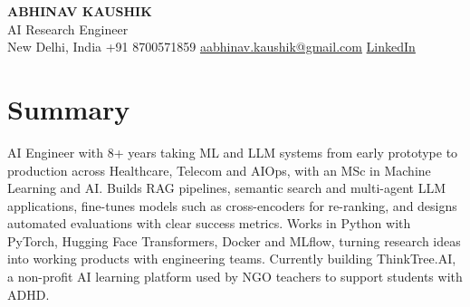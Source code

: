 \documentclass[10pt,a4paper]{article}
\begin{document}
\begin{center}
  {\LARGE\bfseries ABHINAV KAUSHIK}\\[2pt]
  {\large AI Research Engineer}\\[2pt]
  New Delhi, India \textbar{} +91 8700571859 \textbar{} \href{mailto:aabhinav.kaushik@gmail.com}{aabhinav.kaushik@gmail.com} \textbar{} \href{https://www.linkedin.com/in/abhinav-kaushik10/}{LinkedIn}  
\end{center}

\section{Summary}
AI Engineer with 8+ years taking ML and LLM systems from early prototype to production across Healthcare, Telecom and AIOps, with an MSc in Machine Learning and AI. Builds RAG pipelines, semantic search and multi-agent LLM applications, fine-tunes models such as cross-encoders for re-ranking, and designs automated evaluations with clear success metrics. Works in Python with PyTorch, Hugging Face Transformers, Docker and MLflow, turning research ideas into working products with engineering teams. Currently building ThinkTree.AI, a non-profit AI learning platform used by NGO teachers to support students with ADHD.
\end{document}
